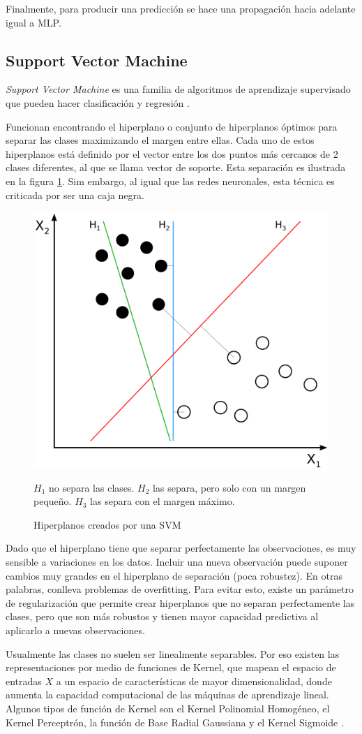 Finalmente, para producir una predicción se hace una propagación hacia adelante igual a \ac{MLP}.

\subsection{Support Vector Machine}

\textit{Support Vector Machine} es una familia de algoritmos de aprendizaje supervisado que pueden hacer clasificación y regresión \citep{cortes1995support}.

Funcionan encontrando el hiperplano o conjunto de hiperplanos óptimos para separar las clases maximizando el margen entre ellas. Cada uno de estos hiperplanos está definido por el vector entre los dos puntos más cercanos de 2 clases diferentes, al que se llama vector de soporte. Esta separación es ilustrada en la figura \ref{fig:svm-hiperplanos}. Sim embargo, al igual que las redes neuronales, esta técnica es criticada por ser una caja negra.

\begin{figure}[htbp]
	\centering
	\includegraphics[width=0.4\linewidth]{graficos/svm_hiperplanos.png}
	\caption{Hiperplanos creados por una SVM \citep{wiki:svm_figure}}
	\label{fig:svm-hiperplanos}
	\par
	\small
	$H_1$ no separa las clases. $H_2$ las separa, pero solo con un margen pequeño. $H_3$ las separa con el margen máximo.
\end{figure}

Dado que el hiperplano tiene que separar perfectamente las observaciones, es muy sensible a variaciones en los datos. Incluir una nueva observación puede suponer cambios muy grandes en el hiperplano de separación (poca robustez). En otras palabras, conlleva problemas de overfitting. Para evitar esto, existe un parámetro de regularización que permite crear hiperplanos que no separan perfectamente las clases, pero que son más robustos y tienen mayor capacidad predictiva al aplicarlo a nuevas observaciones.

Usualmente las clases no suelen ser linealmente separables. Por eso existen las representaciones por medio de funciones de Kernel, que mapean el espacio de entradas $X$ a un espacio de características de mayor dimensionalidad, donde aumenta la capacidad computacional de las máquinas de aprendizaje lineal. Algunos tipos de función de Kernel son el Kernel Polinomial Homogéneo, el Kernel Perceptrón, la función de Base Radial Gaussiana y el Kernel Sigmoide \citep{cristianini2000introduction}.

